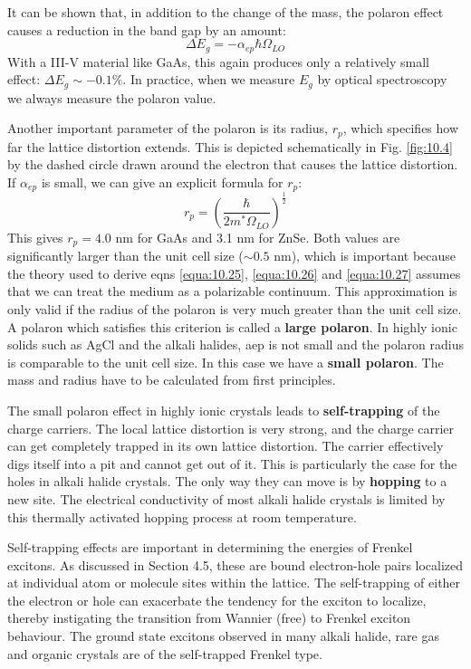 \documentclass[12pt]{book}
\begin{document}
{It can be shown that, in addition to the change of the mass, the polaron effect causes a reduction in the band gap by an amount:
\begin{equation}\label{equa:10.26}
  \Delta E_g=-\alpha_{ep}\hbar\Omega_{LO}
\end{equation}
With a III-V material like GaAs, this again produces only a relatively small effect: $\Delta E_g\sim-0.1\%$. In practice, when we measure $E_g$ by optical spectroscopy we always measure the polaron value.

Another important parameter of the polaron is its radius, $r_p$, which specifies how far the lattice distortion extends. This is depicted schematically in Fig. \ref{fig:10.4} by the dashed circle drawn around the electron that causes the lattice distortion. If $\alpha_{ep}$ is small, we can give an explicit formula for $r_p$:
\begin{equation}\label{equa:10.27}
  r_p=\left(\frac{\hbar}{2m^*\Omega_{LO}}\right)^{\frac{1}{2}}
\end{equation}
This gives $r_p = 4.0$ nm for GaAs and 3.1 nm for ZnSe. Both values are significantly larger than the unit cell size ($\sim0.5$ nm), which is important because the theory used to derive eqns \ref{equa:10.25}, \ref{equa:10.26} and \ref{equa:10.27} assumes that we can treat the medium as a polarizable continuum. This approximation is only valid if the radius of the polaron is very much greater than the unit cell size. A polaron which satisfies this criterion is called a \textbf{large polaron}. In highly ionic solids such as AgCl and the alkali halides, aep is not small and the polaron radius is comparable to the unit cell size. In this case we have a \textbf{small polaron}. The mass and radius have to be calculated from first principles.

The small polaron effect in highly ionic crystals leads to \textbf{self-trapping} of the charge carriers. The local lattice distortion is very strong, and the charge carrier can get completely trapped in its own lattice distortion. The carrier effectively digs itself into a pit and cannot get out of it. This is particularly the case for the holes in alkali halide crystals. The only way they can move is by \textbf{hopping} to a new site. The electrical conductivity of most alkali halide crystals is limited by this thermally activated hopping process at room temperature.

Self-trapping effects are important in determining the energies of Frenkel excitons. As discussed in Section 4.5, these are bound electron-hole pairs localized at individual atom or molecule sites within the lattice. The self-trapping of either the electron or hole can exacerbate the tendency for the exciton to localize, thereby instigating the transition from Wannier (free) to Frenkel exciton behaviour. The ground state excitons observed in many alkali halide, rare gas and organic crystals are of the self-trapped Frenkel type.

}
\end{document}
